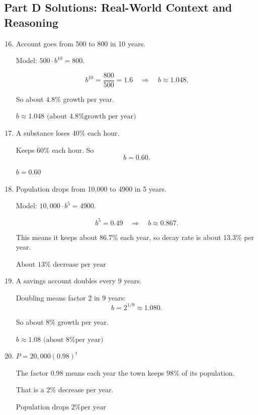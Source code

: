 \documentclass[14pt]{extarticle}
\begin{document}
\subsection*{Part D Solutions: Real-World Context and Reasoning}
\begin{enumerate}
  \setcounter{enumi}{15}
  \item Account goes from 500 to 800 in 10 years.

  Model: \(500 \cdot b^{10} = 800.\)

  \[
  b^{10} = \frac{800}{500} = 1.6
  \quad \Rightarrow \quad
  b \approx 1.048.
  \]

  So about \(4.8\%\) growth per year.

  \(\boxed{b \approx 1.048 \text{ (about 4.8\% growth per year)}}\)

  \item A substance loses 40\% each hour.

  Keeps 60\% each hour. So
  \[
  b = 0.60.
  \]

  \(\boxed{b = 0.60}\)

  \item Population drops from 10{,}000 to 4900 in 5 years.

  Model: \(10{,}000 \cdot b^5 = 4900.\)

  \[
  b^5 = 0.49 \quad \Rightarrow \quad b \approx 0.867.
  \]

  This means it keeps about 86.7\% each year, so decay rate is about 13.3\% per year.

  \(\boxed{\text{About } 13\% \text{ decrease per year}}\)

  \item A savings account doubles every 9 years.

  Doubling means factor 2 in 9 years:
  \[
  b = 2^{1/9} \approx 1.080.
  \]

  So about 8\% growth per year.

  \(\boxed{b \approx 1.08 \text{ (about 8\% per year)}}\)

  \item \(P = 20{,}000(0.98)^t\)

  The factor 0.98 means each year the town keeps 98\% of its population.

  That is a 2\% decrease per year.

  \(\boxed{\text{Population drops 2\% per year}}\)
\end{enumerate}
\end{document}
